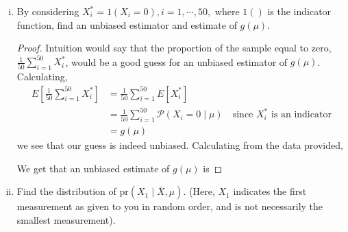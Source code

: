 \documentclass[letterpaper, 12pt]{article}
\newcommand{\cP}{\mathcal{P}}
\newcommand{\pr}{\text{pr}}
\newcommand{\sbs}{\;|\;} %
\begin{document}
\begin{enumerate}
\begin{enumerate}[(i)]
\item
By considering $X_i^* = 1 (X_i = 0), i = 1, \cdots, 50,$ where $1()$ is the indicator function, find an unbiased estimator and estimate of $g(\mu)$.
\begin{proof}
Intuition would say that the proportion of the sample equal to zero, $\frac{1}{50} \sum_{i=1}^{50} X_i^*$, would be a good guess for an unbiased estimator of $g(\mu)$. Calculating,
\begin{align}
E\left[  \frac{1}{50} \sum_{i=1}^{50} X_i^* \right] 
&= \frac{1}{50} \sum_{i=1}^{50} E[X_i^*] \\
&= \frac{1}{50} \sum_{i=1}^{50} \cP (X_i = 0 \sbs \mu)
\quad \text{since $X_i^*$ is an indicator}  \\
&= g(\mu)
\end{align}
we see that our guess is indeed unbiased.
Calculating from the data provided, 


We get that an unbiased estimate of $g(\mu)$ is %
\end{proof}

\item
Find the distribution of 	$\pr(X_1 \sbs \bar{X}, \mu)$. (Here, $X_1$ indicates the first measurement as given to you in random order, and is not necessarily the smallest measurement).


\end{enumerate}
\end{enumerate}
\end{document}

